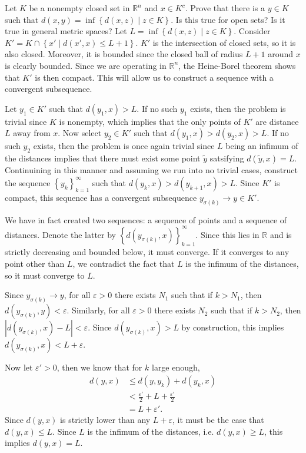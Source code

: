 \documentclass[10pt]{amsart}
\theoremstyle{plain}
\newenvironment{exercise}[1]{%
  \renewcommand\themanualtheoreminner{#1}%
  \manualtheoreminner
}{\endmanualtheoreminner}
\theoremstyle{definition}
\begin{document}
\begin{exercise}{3.17}
	Let $K$ be a nonempty closed set in $\mathbb{R}^n$ and $x \in K^c$. Prove that there is a $y \in K$ such that $d(x,y) = \inf\left\{ d(x,z) \;|\; z\in K \right\}$. Is this true for open sets? Is it true in general metric spaces?
	\hrulefill
\end{exercise}
Let $L = \inf\left\{ d(x,z) \;|\; z\in K \right\}$. Consider $K' = K \cap \left\{ x' \;|\; d(x',x) \leq L + 1 \right\}$. $K'$ is the intersection of closed sets, so it is also closed. Moreover, it is bounded since the closed ball of radius $L+1$ around $x$ is clearly bounded. Since we are operating in $\mathbb{R}^n$, the Heine-Borel theorem shows that $K'$ is then compact. This will allow us to construct a sequence with a convergent subsequence.

Let $y_1 \in K'$ such that $d(y_1,x) > L$. If no such $y_1$ exists, then the problem is trivial since $K$ is nonempty, which implies that the only points of $K'$ are distance $L$ away from $x$. Now select $y_2 \in K'$ such that $d(y_1,x) > d(y_2,x) > L$. If no such $y_2$ exists, then the problem is once again trivial since $L$ being an infimum of the distances implies that there must exist some point $\tilde{y}$ satsifying $d(\tilde{y},x) = L$. Continuining in this manner and assuming we run into no trivial cases, construct the sequence $\left\{ y_k \right\}_{k=1}^\infty$ such that $d(y_k,x) > d(y_{k+1},x) > L$. Since $K'$ is compact, this sequence has a convergent subsequence $y_{\sigma(k)} \to y \in K'$.

We have in fact created two sequences: a sequence of points and a sequence of distances. Denote the latter by $\left\{ d(y_{\sigma(k)},x) \right\}_{k=1}^\infty$. Since this lies in $\mathbb{R}$ and is strictly decreasing and bounded below, it must converge. If it converges to any point other than $L$, we contradict the fact that $L$ is the infimum of the distances, so it must converge to $L$.

Since $y_{\sigma(k)} \to y$, for all $\varepsilon>0$ there exists $N_1$ such that if $k > N_1$, then $d(y_{\sigma(k)}, y) < \varepsilon$. Similarly, for all $\varepsilon>0$ there exists $N_2$ such that if $k > N_2$, then $|d(y_{\sigma(k)},x)-L| < \varepsilon$. Since $d(y_{\sigma(k)},x)>L$ by construction, this implies $d(y_{\sigma(k)},x)<L+\varepsilon$.

Now let $\varepsilon' > 0$, then we know that for $k$ large enough,
\begin{align*}
	d(y,x) &\leq d(y,y_k) + d(y_k,x) \\
	       &< \frac{\varepsilon'}{2} + L + \frac{\varepsilon'}{2} \\
	       &= L + \varepsilon'.
\end{align*}
Since $d(y,x)$ is strictly lower than any $L+\varepsilon$, it must be the case that $d(y,x) \leq L$. Since $L$ is the infimum of the distances, i.e. $d(y,x) \geq L$, this implies $d(y,x) = L$.
\end{document}
